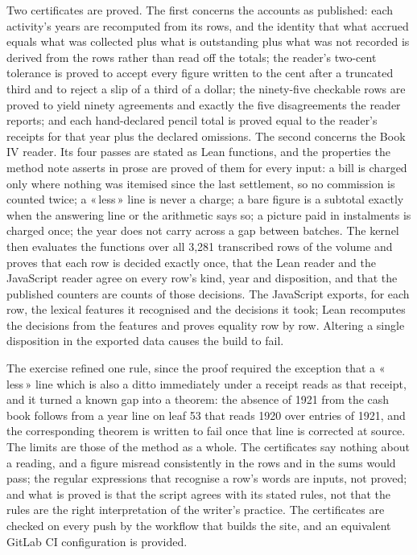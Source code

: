 \documentclass[11pt]{article}
\newcommand{\q}[1]{«\,#1\,»}
\begin{document}
Two certificates are proved. The first concerns the accounts as published: each activity's years are recomputed from its rows, and the identity that what accrued equals what was collected plus what is outstanding plus what was not recorded is derived from the rows rather than read off the totals; the reader's two-cent tolerance is proved to accept every figure written to the cent after a truncated third and to reject a slip of a third of a dollar; the ninety-five checkable rows are proved to yield ninety agreements and exactly the five disagreements the reader reports; and each hand-declared pencil total is proved equal to the reader's receipts for that year plus the declared omissions. The second concerns the Book IV reader. Its four passes are stated as Lean functions, and the properties the method note asserts in prose are proved of them for every input: a bill is charged only where nothing was itemised since the last settlement, so no commission is counted twice; a \q{less} line is never a charge; a bare figure is a subtotal exactly when the answering line or the arithmetic says so; a picture paid in instalments is charged once; the year does not carry across a gap between batches. The kernel then evaluates the functions over all 3,281 transcribed rows of the volume and proves that each row is decided exactly once, that the Lean reader and the JavaScript reader agree on every row's kind, year and disposition, and that the published counters are counts of those decisions. The JavaScript exports, for each row, the lexical features it recognised and the decisions it took; Lean recomputes the decisions from the features and proves equality row by row. Altering a single disposition in the exported data causes the build to fail.

The exercise refined one rule, since the proof required the exception that a \q{less} line which is also a ditto immediately under a receipt reads as that receipt, and it turned a known gap into a theorem: the absence of 1921 from the cash book follows from a year line on leaf 53 that reads 1920 over entries of 1921, and the corresponding theorem is written to fail once that line is corrected at source. The limits are those of the method as a whole. The certificates say nothing about a reading, and a figure misread consistently in the rows and in the sums would pass; the regular expressions that recognise a row's words are inputs, not proved; and what is proved is that the script agrees with its stated rules, not that the rules are the right interpretation of the writer's practice. The certificates are checked on every push by the workflow that builds the site, and an equivalent GitLab CI configuration is provided.
\end{document}
